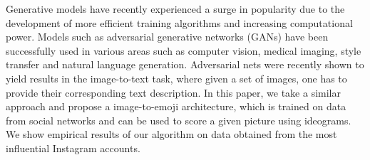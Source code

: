 Generative models have recently experienced a surge in popularity due to the development of more efficient training algorithms and increasing computational power. Models such as adversarial generative networks (GANs) have been successfully used in various areas such as computer vision, medical imaging, style transfer and natural language generation. Adversarial nets were recently shown to yield results in the image-to-text task, where given a set of images, one has to provide their corresponding text description. In this paper, we take a similar approach and propose a image-to-emoji architecture, which is trained on data from social networks and can be used to score a given picture using ideograms. We show empirical results of our algorithm on data obtained from the most influential Instagram accounts.
